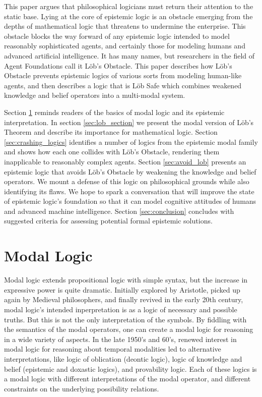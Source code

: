 This paper argues that philosophical logicians must return their attention to the static base. Lying at the core of epistemic logic is an obstacle emerging from the depths of mathematical logic that threatens to undermine the enterprise. This obstacle blocks the way forward of any epistemic logic intended to model reasonably sophisticated agents, and certainly those for modeling humans and advanced artificial intelligence. It has many names, but researchers in the field of Agent Foundations call it L\"ob's Obstacle. This paper describes how L\"ob's Obstacle prevents epistemic logics of various sorts from modeling human-like agents, and then describes a logic that is L\"ob Safe which combines weakened knowledge and belief operators into a multi-modal system.

Section \ref{sec:modal_section} reminds readers of the basics of modal logic and its epistemic interpretation. In section \ref{sec:lob_section} we present the modal version of L\"ob's Theorem and describe its importance for mathematical logic. Section \ref{sec:crashing_logics} identifies a number of logics from the epistemic modal family and shows how each one collides with L\"ob's Obstacle, rendering them inapplicable to reasonably complex agents. Section \ref{sec:avoid_lob} presents an epistemic logic that avoids L\"ob's Obstacle by weakening the knowledge and belief operators. We mount a defense of this logic on philosophical grounds while also identifying its flaws. We hope to spark a conversation that will improve the state of epistemic logic's foundation so that it can model cognitive attitudes of humans and advanced machine intelligence. Section \ref{sec:conclusion} concludes with suggested criteria for assessing potential formal epistemic solutions.


\section{Modal Logic}
\label{sec:modal_section}
Modal logic extends propositional logic with simple syntax, but the increase in expressive power is quite dramatic. Initially explored by Aristotle, picked up again by Medieval philosophers, and finally revived in the early 20th century, modal logic's intended inperpretation is as a logic of necessary and possible truths. But this is not the only interpretation of the symbols. By fiddling with the semantics of the modal operators, one can create a modal logic for reasoning in a wide variety of aspects. In the late 1950's and 60's, renewed interest in modal logic for reasoning about temporal modalities led to alternative interpretations, like logic of oblication (deontic logic), logic of knowledge and belief (epistemic and doxastic logics), and provability logic. Each of these logics is a modal logic with different interpretations of the modal operator, and different constraints on the underlying possibility relations.

